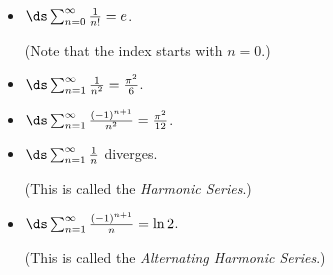 \setboxwidth{20pt}
{\begin{itemize}
\item	\parbox{90pt}{$\ds\sum_{n=0}^\infty \frac1{n!} = e$. } (Note that the index starts with $n=0$.)
\item	$\ds\sum_{n=1}^\infty \frac1{n^2} = \frac{\pi^2}{6}$.
\item	$\ds\sum_{n=1}^\infty \frac{(-1)^{n+1}}{n^2} = \frac{\pi^2}{12}$.
\item	\parbox{90pt}{$\ds\sum_{n=1}^\infty \frac{1}{n} $ \quad diverges.} (This is called the \emph{Harmonic Series}.)
\item	\parbox{90pt}{$\ds\sum_{n=1}^\infty \frac{(-1)^{n+1}}{n} = \ln 2$.} (This is called the \emph{Alternating Harmonic Series}.)
\end{itemize}
}
\restoreboxwidth

